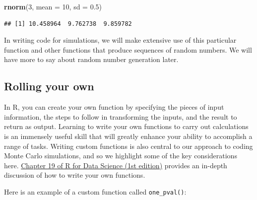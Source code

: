 \documentclass[
]{book}
\newenvironment{Shaded}{\begin{snugshade}}{\end{snugshade}}
\newcommand{\AttributeTok}[1]{\textcolor[rgb]{0.13,0.29,0.53}{#1}}
\newcommand{\ControlFlowTok}[1]{\textcolor[rgb]{0.13,0.29,0.53}{\textbf{#1}}}
\newcommand{\DecValTok}[1]{\textcolor[rgb]{0.00,0.00,0.81}{#1}}
\newcommand{\FloatTok}[1]{\textcolor[rgb]{0.00,0.00,0.81}{#1}}
\newcommand{\FunctionTok}[1]{\textcolor[rgb]{0.13,0.29,0.53}{\textbf{#1}}}
\newcommand{\NormalTok}[1]{#1}
\newcommand{\OtherTok}[1]{\textcolor[rgb]{0.56,0.35,0.01}{#1}}
\newcommand{\SpecialCharTok}[1]{\textcolor[rgb]{0.81,0.36,0.00}{\textbf{#1}}}
\begin{document}
\begin{Shaded}
\begin{Highlighting}[]
\FunctionTok{rnorm}\NormalTok{(}\DecValTok{3}\NormalTok{, }\AttributeTok{mean =} \DecValTok{10}\NormalTok{, }\AttributeTok{sd =} \FloatTok{0.5}\NormalTok{)}
\end{Highlighting}
\end{Shaded}

\begin{verbatim}
## [1] 10.458964  9.762738  9.859782
\end{verbatim}

In writing code for simulations, we will make extensive use of this particular function and other functions that produce sequences of random numbers.
We will have more to say about random number generation later.

\subsection{Rolling your own}\label{rolling-your-own}

In R, you can create your own function by specifying the pieces of input information, the steps to follow in transforming the inputs, and the result to return as output.
Learning to write your own functions to carry out calculations is an immensely useful skill that will greatly enhance your ability to accomplish a range of tasks.
Writing custom functions is also central to our approach to coding Monte Carlo simulations, and so we highlight some of the key considerations here.
\href{https://r4ds.had.co.nz/functions.html}{Chapter 19 of R for Data Science (1st edition)} provides an in-depth discussion of how to write your own functions.

Here is an example of a custom function called \texttt{one\_pval()}:

\begin{Shaded}
\end{Shaded}
\end{document}
